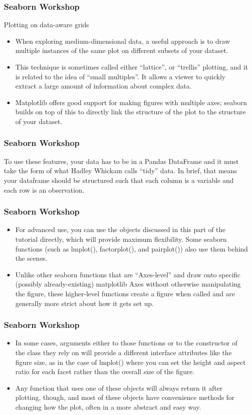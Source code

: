 \documentclass{beamer}
\begin{document}
\begin{frame}[fragile]
	\frametitle{Seaborn Workshop}
	\large
Plotting on data-aware grids
\begin{itemize}
\item When exploring medium-dimensional data, a useful approach is to draw multiple instances of the same plot on different subsets of your dataset. 
\item This technique is sometimes called either “lattice”, or “trellis” plotting, and it is related to the idea of “small multiples”. It allows a viewer to quickly extract a large amount of information about complex data. 
\item Matplotlib offers good support for making figures with multiple axes; seaborn builds on top of this to directly link the structure of the plot to the structure of your dataset.
\end{itemize}
\end{frame}
\begin{frame}[fragile]
\frametitle{Seaborn Workshop}
\large
To use these features, your data has to be in a Pandas DataFrame and it must take the form of what Hadley Whickam calls “tidy” data. In brief, that means your dataframe should be structured such that each column is a variable and each row is an observation.
\end{frame}
\begin{frame}[fragile]
\frametitle{Seaborn Workshop}
\large
\begin{itemize}
\item	For advanced use, you can use the objects discussed in this part of the tutorial directly, which will provide maximum flexibility. Some seaborn functions (such as lmplot(), factorplot(), and pairplot()) also use them behind the scenes. 
\item Unlike other seaborn functions that are “Axes-level” and draw onto specific (possibly already-existing) matplotlib Axes without otherwise manipulating the figure, these higher-level functions create a figure when called and are generally more strict about how it gets set up.
\end{itemize} 
\end{frame}
\begin{frame}[fragile]
	\frametitle{Seaborn Workshop}
	\large
\begin{itemize}
\item 
In some cases, arguments either to those functions or to the constructor of the class they rely on will provide a different interface attributes like the figure size, as in the case of lmplot() where you can set the height and aspect ratio for each facet rather than the overall size of the figure.
\item  Any function that uses one of these objects will always return it after plotting, though, and most of these objects have convenience methods for changing how the plot, often in a more abstract and easy way.
\end{itemize}
\end{frame}
\end{document}
